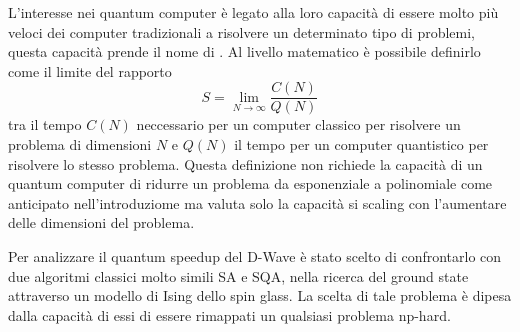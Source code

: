 L'interesse nei quantum computer è legato alla loro capacità di essere molto più veloci dei computer tradizionali a risolvere un determinato tipo di problemi, questa capacità prende il nome di . Al livello matematico è possibile definirlo come il limite del rapporto
$$S = \lim_{N \to \infty} \frac{C(N)}{Q(N)}$$
tra il tempo $C(N)$ neccessario per un computer classico per risolvere un problema di dimensioni $N$ e $Q(N)$ il tempo per un computer quantistico per risolvere lo stesso problema. Questa definizione non richiede la capacità di un quantum computer di ridurre un problema da esponenziale a polinomiale come anticipato nell'introduziome ma valuta solo la capacità si scaling con l'aumentare delle dimensioni del problema.

Per analizzare il quantum speedup del D-Wave è stato scelto di confrontarlo con due algoritmi classici molto simili SA e SQA, nella ricerca del ground state attraverso un modello di Ising dello spin glass.
La scelta di tale problema è dipesa dalla capacità di essi di essere rimappati un qualsiasi problema np-hard.





